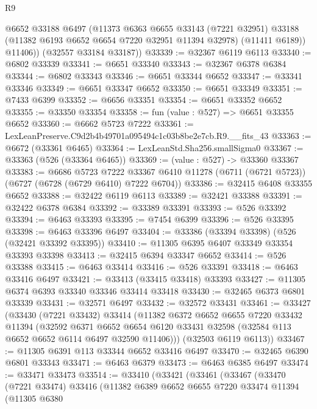 \begin{lexlean}{R9}
\begin{coremodule}
          @6652
          @33188
          @6497
          (@11373
            @6363
            @6655
            @33143
            (@7221 @32951)
            @33188
            (@11382 @6193 @6652 @6654 @7220 @32951 @11394 @32978)
            (@11411 @6189))
          @11406))
      (@32557 @33184 @33187))
@33339 := @32367 @6119 @6113
@33340 := @6802 @33339
@33341 := @6651 @33340
@33343 := @32367 @6378 @6384
@33344 := @6802 @33343
@33346 := @6651 @33344 @6652
@33347 := @33341 @33346
@33349 := @6651 @33347 @6652
@33350 := @6651 @33349
@33351 := @7433 @6399
@33352 := @6656 @33351
@33354 := @6651 @33352 @6652
@33355 := @33350 @33354
@33358 := fun (value : @527) => @6651 @33355 @6652
@33360 := @6662 @5723 @7222
@33361 := LexLeanPreserve.C9d2b4b49701a095494c1c03b8be2e7cb.R9.__fits_43
@33363 := @6672 (@33361 @6465)
@33364 := LexLeanStd.Sha256.smallSigma0
@33367 := @33363 (@526 (@33364 @6465))
@33369 := (value : @527) -> @33360 @33367
@33383 := @6686
    @5723
    @7222
    @33367
    @6410
    @11278
    (@6711 (@6721 @5723))
    (@6727 (@6728 (@6729 @6410) @7222 @6704))
@33386 := @32415 @6408 @33355 @6652
@33388 := @32422 @6119 @6113
@33389 := @32421 @33388
@33391 := @32422 @6378 @6384
@33392 := @33389 @33391
@33393 := @526 @33392
@33394 := @6463 @33393
@33395 := @7454 @6399
@33396 := @526 @33395
@33398 := @6463 @33396 @6497
@33404 := @33386 (@33394 @33398) (@526 (@32421 @33392 @33395))
@33410 := @11305 @6395 @6407 @33349 @33354 @33393 @33398
@33413 := @32415 @6394 @33347 @6652
@33414 := @526 @33388
@33415 := @6463 @33414
@33416 := @526 @33391
@33418 := @6463 @33416 @6497
@33421 := @33413 (@33415 @33418) @33393
@33427 := @11305 @6374 @6393 @33340 @33346 @33414 @33418
@33430 := @32465 @6373 @6801 @33339
@33431 := @32571 @6497
@33432 := @32572 @33431
@33461 := @33427
    (@33430
      (@7221 @33432)
      @33414
      (@11382
        @6372
        @6652
        @6655
        @7220
        @33432
        @11394
        (@32592
          @6371
          @6652
          @6654
          @6120
          @33431
          @32598
          (@32584 @113 @6652 @6652 @6114 @6497 @32590 @11406)))
      (@32503 @6119 @6113))
@33467 := @11305 @6391 @113 @33344 @6652 @33416 @6497
@33470 := @32465 @6390 @6801 @33343
@33471 := @6463 @6379
@33473 := @6463 @6385 @6497
@33474 := @33471 @33473
@33514 := @33410
    (@33421
      (@33461
        (@33467
          (@33470
            (@7221 @33474)
            @33416
            (@11382
              @6389
              @6652
              @6655
              @7220
              @33474
              @11394
              (@11305
                @6380

\end{coremodule}
\end{lexlean}
